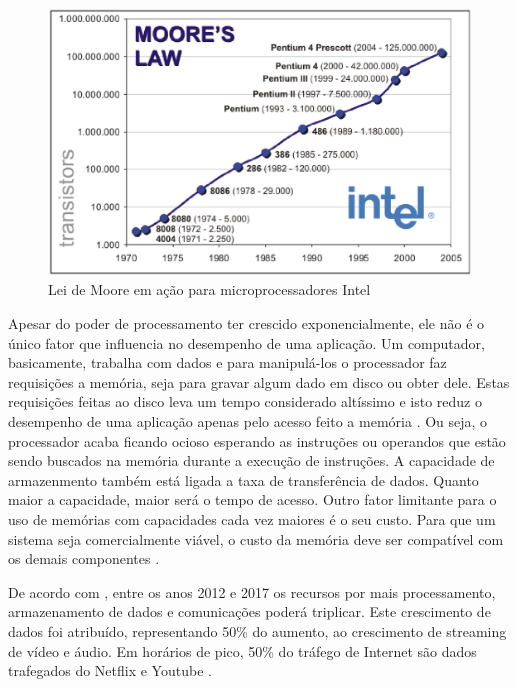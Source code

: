  \begin{figure}[ht]
	\centering
		\includegraphics[keepaspectratio=true,scale=0.5]{figuras/graphicmoore.eps}
	\caption{Lei de Moore em ação para microprocessadores Intel \cite{phonearena}}
	\label{graphicmoore}
\end{figure}

Apesar do poder de processamento ter crescido exponencialmente, ele não é o único fator que influencia no desempenho de uma aplicação. Um computador, basicamente, trabalha com dados e para manipulá-los o processador faz requisições a memória, seja para gravar algum dado em disco ou obter dele. Estas requisições feitas ao disco leva um tempo considerado altíssimo e isto reduz o desempenho de uma aplicação apenas pelo acesso feito a memória \cite{tanenbaumorganizacao}. Ou seja, o processador acaba ficando ocioso esperando as instruções ou operandos que estão sendo buscados na memória durante a execução de instruções. A capacidade de armazenmento também está ligada a taxa de transferência de dados. Quanto maior a capacidade, maior será o tempo de acesso. Outro fator limitante para o uso de memórias com capacidades cada vez maiores é o seu custo. Para que um sistema seja comercialmente viável, o custo da memória deve ser compatível com os demais componentes \cite{tanenbaumorganizacao}. 

De acordo com \cite{cloud}, entre os anos 2012 e 2017 os recursos por mais processamento, armazenamento de dados e comunicações poderá triplicar. Este crescimento de dados foi atribuído, representando 50\% do aumento, ao crescimento de streaming de vídeo e áudio. Em horários de pico, 50\% do tráfego de Internet são dados trafegados do Netflix e Youtube \cite{cloud}.

